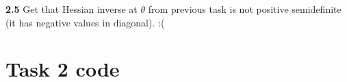 \documentclass[12pt]{article}
\begin{document}
\vspace{5mm}
\textbf{2.5} Get that Hessian inverse at $\theta$ from previous task is not positive semidefinite (it has negative values in diagonal). :(

\appendix
\section{Task 2 code}

% 
% 
% 
\end{document}
